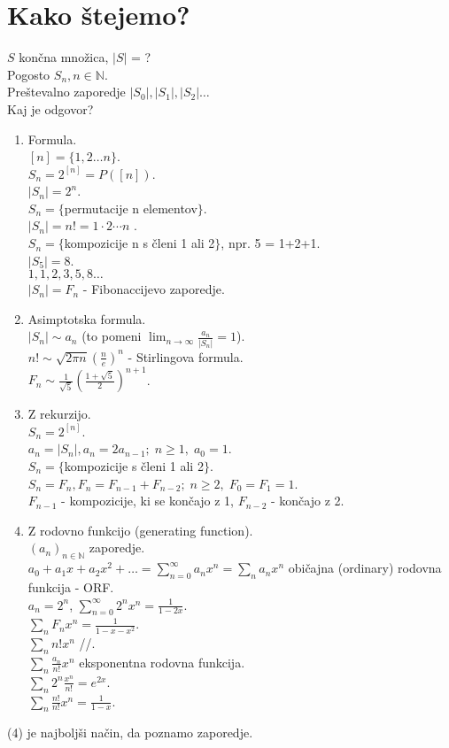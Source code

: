 \documentclass[a4paper, 12pt]{book}
\theoremstyle{definition}
\theoremstyle{remark}
\newcommand{\N}{\mathbb{N}}
\begin{document}
\section{Kako štejemo?}

$S$ končna množica, $|S|$ = ? \\
Pogosto $S_n, n \in \N$. \\
Preštevalno zaporedje $|S_0|, |S_1|, |S_2| \dots$ \\
Kaj je odgovor?

\begin{enumerate}[label=(\arabic{*})]
  \item Formula. \\
    $[n] = \{1, 2 \dots n\}$. \\
    $S_n = 2^{[n]} = P([n])$. \\
    $|S_n| = 2^n$. \\
    $S_n = \{$permutacije n elementov$\}$. \\
    $|S_n| = n! = 1 \cdot 2 \cdots n$  . \\
    $S_n = \{$kompozicije n s členi 1 ali 2$\}$, npr. 5 = 1+2+1. \\
    $|S_5| = 8$. \\
    $1, 1, 2, 3, 5, 8 \dots$ \\
    $|S_n| = F_n$ - Fibonaccijevo zaporedje.
  \item Asimptotska formula. \\
    $|S_n| \sim a_n$ (to pomeni $\lim_{n \to \infty} \frac{a_n}{|S_n|} = 1$). \\
    $n! \sim \sqrt{2 \pi n} \left(\frac{n}{e}\right)^n$ - Stirlingova formula. \\
    $F_n \sim \frac{1}{\sqrt{5}} \left(\frac{1+\sqrt{5}}{2}\right)^{n+1}$.
  \item Z rekurzijo. \\
    $S_n = 2^{[n]}$. \\
    $a_n = |S_n|, a_n = 2a_{n-1}; \; n \geq 1, \; a_0 = 1$. \\
    $S_n = \{$kompozicije s členi 1 ali 2$\}$. \\
    $S_n = F_n, F_n = F_{n-1} + F_{n-2}; \; n \geq 2, \; F_0 = F_1 = 1$. \\
    $F_{n-1}$ - kompozicije, ki se končajo z 1, $F_{n-2}$ - končajo z 2.
  \item Z rodovno funkcijo (generating function). \\
    $(a_n)_{n \in \N}$ zaporedje. \\
    $a_0 + a_1 x + a_2 x^2 + \dots = \sum_{n=0}^{\infty} a_n x^n = \sum_n a_n x^n$
      običajna (ordinary) rodovna funkcija - ORF. \\
    $a_n = 2^n$, $\sum_{n=0}^{\infty} 2^n x^n = \frac{1}{1-2x}$. \\
    $\sum_n F_n x^n = \frac{1}{1-x-x^2}$. \\
    $\sum_n n! x^n$ //. \\
    $\sum_n \frac{a_n}{n!} x^n$ eksponentna rodovna funkcija. \\
    $\sum_n 2^n \frac{x^n}{n!} = e^{2x}$. \\
    $\sum_n \frac{n!}{n!} x^n = \frac{1}{1-x}$.
\end{enumerate}
%
(4) je najboljši način, da poznamo zaporedje.
\end{document}
